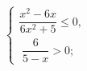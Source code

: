 \begin{ex}[type=ineq_system]
	\begin{condition}
		$\begin{cases} \dfrac{x^2 - 6x}{6x^2 + 5}\leqslant0 ,\\
			\; \dfrac{6}{5 - x}>0  ;
		\end{cases}$
	\end{condition}
	\answer{$ [0;5) ; $}
\end{ex}